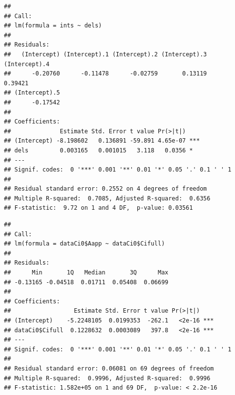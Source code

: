 \documentclass[
]{krantz}
\makeatletter
\newenvironment{Shaded}{\begin{snugshade}}{\end{snugshade}}
\newcommand{\CommentTok}[1]{\textcolor[rgb]{0.56,0.35,0.01}{\textit{#1}}}
\newcommand{\DecValTok}[1]{\textcolor[rgb]{0.00,0.00,0.81}{#1}}
\newcommand{\FunctionTok}[1]{\textcolor[rgb]{0.00,0.00,0.00}{#1}}
\newcommand{\NormalTok}[1]{#1}
\newcommand{\OtherTok}[1]{\textcolor[rgb]{0.56,0.35,0.01}{#1}}
\newcommand{\SpecialCharTok}[1]{\textcolor[rgb]{0.00,0.00,0.00}{#1}}
\newcommand{\StringTok}[1]{\textcolor[rgb]{0.31,0.60,0.02}{#1}}
\newenvironment{kframe}{%
\medskip{}
\setlength{\fboxsep}{.8em}
 \def\at@end@of@kframe{}%
 \ifinner\ifhmode%
  \def\at@end@of@kframe{\end{minipage}}%
  \begin{minipage}{\columnwidth}%
 \fi\fi%
 \def\FrameCommand##1{\hskip\@totalleftmargin \hskip-\fboxsep
 \colorbox{shadecolor}{##1}\hskip-\fboxsep
     \hskip-\linewidth \hskip-\@totalleftmargin \hskip\columnwidth}%
 \MakeFramed {\advance\hsize-\width
   \@totalleftmargin\z@ \linewidth\hsize
   \@setminipage}}%
 {\par\unskip\endMakeFramed%
 \at@end@of@kframe}
\renewenvironment{Shaded}{\begin{kframe}}{\end{kframe}}
\makeatother
\begin{document}
\begin{verbatim}
## 
## Call:
## lm(formula = ints ~ dels)
## 
## Residuals:
##   (Intercept) (Intercept).1 (Intercept).2 (Intercept).3 (Intercept).4 
##      -0.20760      -0.11478      -0.02759       0.13119       0.39421 
## (Intercept).5 
##      -0.17542 
## 
## Coefficients:
##              Estimate Std. Error t value Pr(>|t|)    
## (Intercept) -8.198602   0.136891 -59.891 4.65e-07 ***
## dels         0.003165   0.001015   3.118   0.0356 *  
## ---
## Signif. codes:  0 '***' 0.001 '**' 0.01 '*' 0.05 '.' 0.1 ' ' 1
## 
## Residual standard error: 0.2552 on 4 degrees of freedom
## Multiple R-squared:  0.7085, Adjusted R-squared:  0.6356 
## F-statistic:  9.72 on 1 and 4 DF,  p-value: 0.03561
\end{verbatim}

\begin{Shaded}
\end{Shaded}

\begin{verbatim}
## 
## Call:
## lm(formula = dataCi0$Aapp ~ dataCi0$Cifull)
## 
## Residuals:
##      Min       1Q   Median       3Q      Max 
## -0.13165 -0.04518  0.01711  0.05408  0.06699 
## 
## Coefficients:
##                  Estimate Std. Error t value Pr(>|t|)    
## (Intercept)    -5.2248105  0.0199353  -262.1   <2e-16 ***
## dataCi0$Cifull  0.1228632  0.0003089   397.8   <2e-16 ***
## ---
## Signif. codes:  0 '***' 0.001 '**' 0.01 '*' 0.05 '.' 0.1 ' ' 1
## 
## Residual standard error: 0.06081 on 69 degrees of freedom
## Multiple R-squared:  0.9996, Adjusted R-squared:  0.9996 
## F-statistic: 1.582e+05 on 1 and 69 DF,  p-value: < 2.2e-16
\end{verbatim}
\end{document}
